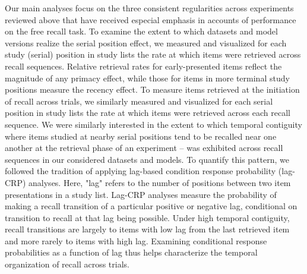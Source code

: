 {}Our main analyses focus on the three consistent regularities across experiments reviewed above that have received especial emphasis in accounts of performance on the free recall task. To examine the extent to which datasets and model versions realize the serial position effect, we measured and visualized for each study (serial) position in study lists the rate at which items were retrieved across recall sequences. Relative retrieval rates for early-presented items reflect the magnitude of any primacy effect, while those for items in more terminal study positions measure the recency effect. To measure items retrieved at the initiation of recall across trials, we similarly measured and visualized for each serial position in study lists the rate at which items were retrieved  across each recall sequence.\markdownRendererInterblockSeparator
{}We were similarly interested in the extent to which temporal contiguity where items studied at nearby serial positions tend to be recalled near one another at the retrieval phase of an experiment -- was exhibited across recall sequences in our considered datasets and models. To quantify this pattern, we followed the tradition of applying lag-based condition response probability (lag-CRP) analyses. Here, "lag" refers to the number of positions between two item presentations in a study list. Lag-CRP analyses measure the probability of making a recall transition of a particular positive or negative lag, conditional on transition to recall at that lag being possible. Under high temporal contiguity, recall transitions are largely to items with low lag from the last retrieved item and more rarely to items with high lag. Examining conditional response probabilities as a function of lag thus helps characterize the temporal organization of recall across trials.\relax